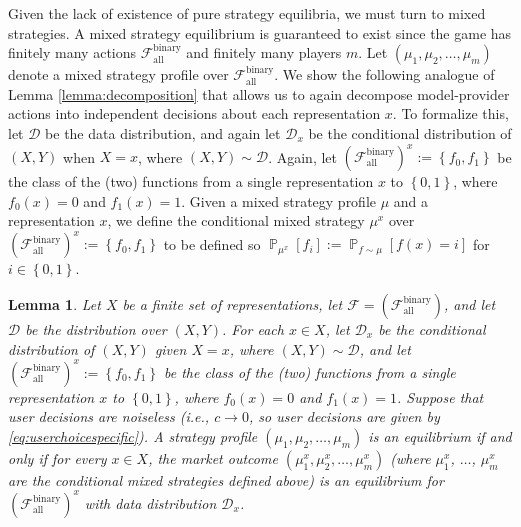\documentclass[letterpaper,11pt]{article}
\newtheorem{lemma}{Lemma}
\theoremstyle{plain}
\DeclareMathOperator*{\Prob}{\mathbb{P}}
\begin{document}
Given the lack of existence of pure strategy equilibria, we must turn to mixed strategies. A mixed strategy equilibrium is guaranteed to exist since the game has finitely many actions $\mathcal{F}^{\text{binary}}_{\text{all}}$ and finitely many players $m$. Let $(\mu_1, \mu_2, \ldots, \mu_m)$ denote a mixed strategy profile over $\mathcal{F}^{\text{binary}}_{\text{all}}$. We show the following analogue of Lemma \ref{lemma:decomposition} that allows us to  again decompose model-provider actions into independent decisions about each representation $x$. To formalize this, let $\mathcal{D}$ be the data distribution, and again let $\mathcal{D}_x$ be the conditional distribution of $(X,Y)$ when $X = x$, where $(X,Y) \sim \mathcal{D}$. Again, let  $(\mathcal{F}^{\text{binary}}_{\text{all}})^x := \left\{f_0, f_1\right\}$ be the class of the (two) functions from a single representation $x$ to $\left\{0,1\right\}$, where $f_0(x) = 0$ and $f_1(x) = 1$.  Given a mixed strategy profile $\mu$ and a representation $x$, we define the conditional mixed strategy $\mu^x$ over $(\mathcal{F}^{\text{binary}}_{\text{all}})^x := \left\{f_0, f_1\right\}$ to be defined so $\Prob_{\mu^x}[f_i] := \Prob_{f \sim \mu}[f(x) = i]$ for $i \in \left\{0,1\right\}$. 
\begin{lemma}
\label{lemma:decompositionmixed}
Let $X$ be a finite set of representations, let $\mathcal{F} = (\mathcal{F}^{\text{binary}}_{\text{all}})$, and let $\mathcal{D}$ be the distribution over $(X,Y)$. For each $x \in X$, let $\mathcal{D}_x$ be the conditional distribution of $(X,Y)$ given $X = x$, where $(X,Y) \sim \mathcal{D}$, and let $(\mathcal{F}^{\text{binary}}_{\text{all}})^x := \left\{f_0, f_1\right\}$ be the class of the (two) functions from a single representation $x$ to $\left\{0,1\right\}$, where $f_0(x) = 0$ and $f_1(x) = 1$. Suppose that user decisions are noiseless (i.e., $c \rightarrow 0$, so user decisions are given by \eqref{eq:userchoicespecific}). A strategy profile $(\mu_1, \mu_2, \ldots, \mu_m)$ is an equilibrium if and only if for every $x \in X$, the market outcome $(\mu^x_1, \mu^x_2, \ldots, \mu^x_m)$ (where $\mu^x_1$, $\ldots$, $\mu^x_m$ are the conditional mixed strategies defined above) is an equilibrium for $(\mathcal{F}^{\text{binary}}_{\text{all}})^x$ with data distribution $\mathcal{D}_x$.
\end{lemma}
\end{document}
